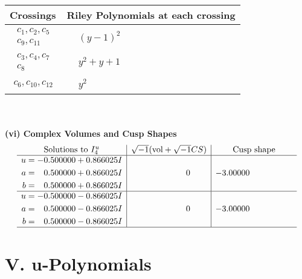 \documentclass[1p]{elsarticle_modified}
\theoremstyle{definition}
\newcommand{\I}{\sqrt{-1}}
\begin{document}
\begin{tabular}{m{50pt}|m{274pt}}
Crossings & \hspace{64pt}Riley Polynomials at each crossing \\
\hline $$\begin{aligned}c_{1},c_{2},c_{5}\\c_{9},c_{11}\end{aligned}$$&$\begin{aligned}
&(y-1)^2
\end{aligned}$\\
\hline $$\begin{aligned}c_{3},c_{4},c_{7}\\c_{8}\end{aligned}$$&$\begin{aligned}
&y^2+y+1
\end{aligned}$\\
\hline $$\begin{aligned}c_{6},c_{10},c_{12}\end{aligned}$$&$\begin{aligned}
&y^2
\end{aligned}$\\
\hline
\end{tabular}\\~\\
\newpage\flushleft \textbf{(vi) Complex Volumes and Cusp Shapes}
$$\begin{array}{c|c|c}  
\text{Solutions to }I^u_{4}& \I (\text{vol} + \sqrt{-1}CS) & \text{Cusp shape}\\
 \hline 
\begin{aligned}
u &= -0.500000 + 0.866025 I \\
a &= \phantom{-}0.500000 + 0.866025 I \\
b &= \phantom{-}0.500000 + 0.866025 I\end{aligned}
 & \phantom{-0.000000 } 0 & -3.00000\phantom{ +0.000000I} \\ \hline\begin{aligned}
u &= -0.500000 - 0.866025 I \\
a &= \phantom{-}0.500000 - 0.866025 I \\
b &= \phantom{-}0.500000 - 0.866025 I\end{aligned}
 & \phantom{-0.000000 } 0 & -3.00000\phantom{ +0.000000I}\\
 \hline 
 \end{array}$$\newpage
\newpage\renewcommand{\arraystretch}{1}
\centering \section*{ V. u-Polynomials}
\end{document}
